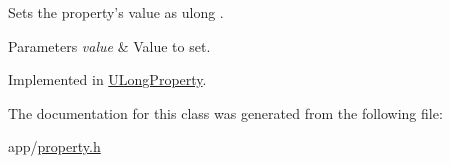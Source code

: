 Sets the property's value as ulong . 


\begin{DoxyParams}{Parameters}
{\em value} & Value to set. \\
\hline
\end{DoxyParams}


Implemented in \hyperlink{class_u_long_property_ac52a81a11a65723ab008ba066be522f3}{U\-Long\-Property}.



The documentation for this class was generated from the following file\-:\begin{DoxyCompactItemize}
\item 
app/\hyperlink{property_8h}{property.\-h}\end{DoxyCompactItemize}
